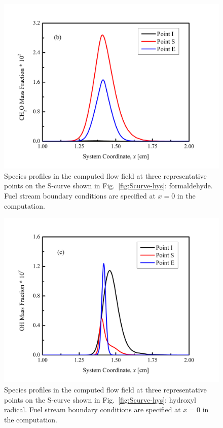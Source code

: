 \begin{figure}[t]
  \centering
  \scriptsize
  \includegraphics[width=1.0\textwidth]{ch-NTC/sp_b.png}
  \normalsize
  \caption{Species profiles in the computed flow field at three representative points on the S-curve shown in Fig.~\ref{fig:Scurve-hys}: formaldehyde.  Fuel stream boundary conditions are specified at $x=0$ in the computation.}
  \label{fig:NTC-species_b}
\end{figure}

\begin{figure}[t]
  \centering
  \scriptsize
  \includegraphics[width=1.0\textwidth]{ch-NTC/sp_c.png}
  \normalsize
  \caption{Species profiles in the computed flow field at three representative points on the S-curve shown in Fig.~\ref{fig:Scurve-hys}: hydroxyl radical.  Fuel stream boundary conditions are specified at $x=0$ in the computation.}
  \label{fig:NTC-species_c}
\end{figure}

